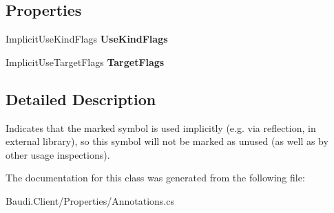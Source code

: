 \subsection*{Properties}
\begin{DoxyCompactItemize}
\item 
\hypertarget{class_used_implicitly_attribute_a7755e382c9638ee26bc7a45584ced5ff}{}Implicit\+Use\+Kind\+Flags {\bfseries Use\+Kind\+Flags}\label{class_used_implicitly_attribute_a7755e382c9638ee26bc7a45584ced5ff}

\item 
\hypertarget{class_used_implicitly_attribute_a2efb3586ffa41ca609769f825c07a508}{}Implicit\+Use\+Target\+Flags {\bfseries Target\+Flags}\label{class_used_implicitly_attribute_a2efb3586ffa41ca609769f825c07a508}

\end{DoxyCompactItemize}


\subsection{Detailed Description}
Indicates that the marked symbol is used implicitly (e.\+g. via reflection, in external library), so this symbol will not be marked as unused (as well as by other usage inspections). 



The documentation for this class was generated from the following file\+:\begin{DoxyCompactItemize}
\item 
Baudi.\+Client/\+Properties/Annotations.\+cs\end{DoxyCompactItemize}
